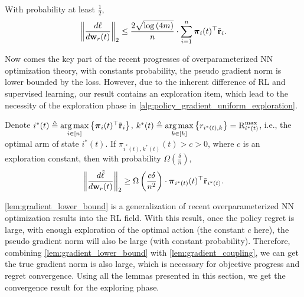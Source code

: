 \begin{lem}
\label{lem:gradient_upper_bound}
With probability at least $\frac{1}{2}$,
\begin{equation*}
\begin{split}
	\left\| \frac{d\ell}{d {\mathbf{w}}_r(t)} \right\|_2 \le \frac{2 \sqrt{\log{\left(4m\right)}}}{n} \cdot \sum\limits_{i=1}^{n}{ {\boldsymbol{\pi}}_{i}(t)^\top {\tilde{\mathbf{r}}}_i }.
\end{split}
\end{equation*}
\end{lem}

Now comes the key part of the recent progresses of overparameterized NN optimization theory, with constants probability, the pseudo gradient norm is lower bounded by the loss. However, due to the inherent difference of RL and supervised learning, our result contains an exploration item, which lead to the necessity of the exploration phase in \cref{alg:policy_gradient_uniform_exploration}. 

\begin{lem}
\label{lem:gradient_lower_bound}
	Denote $i^*(t) \triangleq \operatorname*{arg\,max}\limits_{i \in [n]}\left\{{\boldsymbol{\pi}}_i(t)^\top {\tilde{\mathbf{r}}}_i \right\}$, $k^*(t) \triangleq \operatorname*{arg\,max}\limits_{k \in [h]}\left\{ r_{i^*(t),k} \right\} = {\text{R}}_{i^*(t)}^{\max}$, i.e., the optimal arm of state $i^*(t)$. If $\pi_{i^*(t), k^*(t)}(t) > c > 0$, where $c$ is an exploration constant, then with probability $\Omega\left( \frac{\delta}{n} \right)$,
\begin{equation*}
\begin{split}
	\left\| \frac{d\tilde{\ell}}{d {\mathbf{w}}_r(t)} \right\|_2 \ge \Omega\left( \frac{c\delta}{n^2} \right) \cdot {\boldsymbol{\pi}}_{i^*(t)}(t)^\top {\tilde{\mathbf{r}}}_{i^*(t)} .
\end{split}
\end{equation*}
\end{lem}

\cref{lem:gradient_lower_bound} is a generalization of recent overparameterized NN optimization results into the RL field. With this result, once the policy regret is large, with enough exploration of the optimal action (the constant $c$ here), the pseudo gradient norm will also be large (with constant probability). Therefore, combining \cref{lem:gradient_lower_bound} with \cref{lem:gradient_coupling}, we can get the true gradient norm is also large, which is necessary for objective progress and regret convergence. Using all the lemmas presented in this section, we get the convergence result for the exploring phase.

